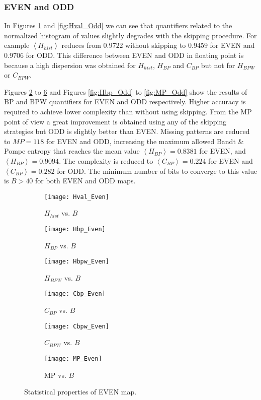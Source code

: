 \subsubsection{EVEN and ODD} \label{sssec:skipp}

In Figures \ref{fig:Hval_Even} and \ref{fig:Hval_Odd} we can see that quantifiers related to the normalized histogram of values slightly degrades with the skipping procedure.
For example $\left\langle H_{hist}\right\rangle $ reduces from $0.9722$ without skipping to $0.9459$ for EVEN and $0.9706$ for ODD. 
This difference between EVEN and ODD in floating point is because a high dispersion was obtained for $H_{hist}$, $H_{BP}$ and $C_{BP}$ but not for $H_{BPW}$ or $C_{BPW}$.

Figures \ref{fig:Hbp_Even} to \ref{fig:MP_Even} and Figures \ref{fig:Hbp_Odd} to \ref{fig:MP_Odd} show the results of BP and BPW quantifiers for EVEN and ODD respectively.
Higher accuracy is required to achieve lower complexity than without using skipping.
From the MP point of view a great improvement is obtained using any of the skipping strategies but ODD is slightly better than EVEN.
Missing patterns are reduced to $MP = 118$ for EVEN and ODD, increasing the maximum allowed Bandt \& Pompe entropy that reaches the mean value $\left\langle H_{BP}\right\rangle  = 0.8381$ for EVEN, and $\left\langle H_{BP}\right\rangle  = 0.9094$.
The complexity is reduced to $\left\langle C_{BP}\right\rangle = 0.224$ for EVEN and $\left\langle C_{BP}\right\rangle = 0.282$ for ODD.
The minimum number of bits to converge to this value is $B>40$ for both EVEN and ODD maps.
%
\begin{figure}[H]
	\centering
	\begin{subfigure}[b]{0.49\textwidth}
		\texttt{[image: Hval\_Even]}
		\caption{$H_{hist}$ vs. $B$}
		\label{fig:Hval_Even}
	\end{subfigure}
	\begin{subfigure}[b]{0.49\textwidth}
		\texttt{[image: Hbp\_Even]}
		\caption{$H_{BP}$ vs. $B$}
		\label{fig:Hbp_Even}
	\end{subfigure}
	\begin{subfigure}[b]{0.49\textwidth}
		\texttt{[image: Hbpw\_Even]}
		\caption{$H_{BPW}$ vs. $B$}
		\label{fig:Hbpw_Even}
	\end{subfigure}
	\begin{subfigure}[b]{0.49\textwidth}
		\texttt{[image: Cbp\_Even]}
		\caption{$C_{BP}$ vs. $B$}
		\label{fig:Cbp_Even}
	\end{subfigure}
	\begin{subfigure}[b]{0.49\textwidth}
		\texttt{[image: Cbpw\_Even]}
		\caption{$C_{BPW}$ vs. $B$}
		\label{fig:Cbpw_Even}
	\end{subfigure}
	\begin{subfigure}[b]{0.49\textwidth}
		\texttt{[image: MP\_Even]}
		\caption{MP vs. $B$}
		\label{fig:MP_Even}
	\end{subfigure}
	\caption{Statistical properties of EVEN map.}
	\label{fig:EVEN_QuantiB}
\end{figure}
